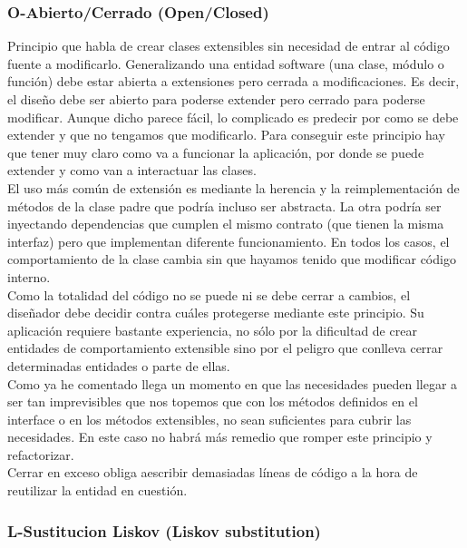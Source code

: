 \documentclass[../pfc.tex]{subfiles}
\begin{document}
	
	\subsubsection{O-Abierto/Cerrado (Open/Closed)}
	
	Principio que habla de crear clases extensibles sin necesidad de entrar al código fuente a modificarlo. Generalizando una entidad software (una clase, módulo o función) debe estar abierta a extensiones pero cerrada a modificaciones. Es decir, el diseño debe ser abierto para poderse extender pero cerrado para poderse modificar. Aunque dicho parece fácil, lo complicado es predecir por como se debe extender y que no tengamos que modificarlo. Para conseguir este principio hay que tener muy claro como va a funcionar la aplicación, por donde se puede extender y como van a interactuar las clases.\\
	
	El uso más común de extensión es mediante la herencia y la reimplementación de métodos de la clase padre que podría incluso ser abstracta. La otra podría ser inyectando dependencias que cumplen el mismo contrato (que tienen la misma interfaz) pero que implementan diferente funcionamiento. En todos los casos, el comportamiento de la clase cambia sin que hayamos tenido que modificar código interno.\\
		
	Como la totalidad del código no se puede ni se debe cerrar a cambios, el diseñador debe decidir contra cuáles protegerse mediante este principio. Su aplicación requiere bastante experiencia, no sólo por la dificultad de crear entidades de comportamiento extensible sino por el peligro que conlleva cerrar determinadas entidades o parte de ellas.\\
	
	Como ya he comentado llega un momento en que las necesidades pueden llegar a ser tan imprevisibles que nos topemos que con los métodos definidos en el interface o en los métodos extensibles, no sean suficientes para cubrir las necesidades. En este caso no habrá más remedio que romper este principio y refactorizar.\\
	
	Cerrar en exceso obliga aescribir demasiadas líneas de código a la hora de reutilizar la entidad en cuestión. \\
	
	
	\subsubsection{L-Sustitucion Liskov (Liskov substitution)}
	
\end{document}
